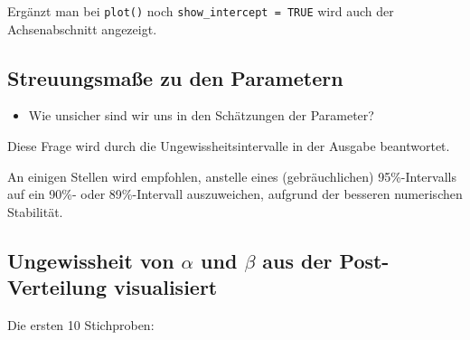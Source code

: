 \documentclass[
  a4paper,
  DIV=11]{scrreprt}
\providecommand{\tightlist}{%
  \setlength{\itemsep}{0pt}\setlength{\parskip}{0pt}}\usepackage{longtable,booktabs,array}
\theoremstyle{definition}
\theoremstyle{remark}
\begin{document}
Ergänzt man bei \texttt{plot()} noch \texttt{show\_intercept\ =\ TRUE}
wird auch der Achsenabschnitt angezeigt.

\hypertarget{streuungsmauxdfe-zu-den-parametern}{%
\subsection{Streuungsmaße zu den
Parametern}\label{streuungsmauxdfe-zu-den-parametern}}

\begin{itemize}
\tightlist
\item
  Wie unsicher sind wir uns in den Schätzungen der Parameter?
\end{itemize}

Diese Frage wird durch die Ungewissheitsintervalle in der Ausgabe
beantwortet.

\begin{tcolorbox}[enhanced jigsaw, title=\textcolor{quarto-callout-note-color}{\faInfo}\hspace{0.5em}{Hinweis}, bottomtitle=1mm, bottomrule=.15mm, titlerule=0mm, colbacktitle=quarto-callout-note-color!10!white, colframe=quarto-callout-note-color-frame, leftrule=.75mm, left=2mm, toprule=.15mm, colback=white, arc=.35mm, breakable, toptitle=1mm, opacityback=0, rightrule=.15mm, coltitle=black, opacitybacktitle=0.6]

An einigen Stellen wird empfohlen, anstelle eines (gebräuchlichen)
95\%-Intervalls auf ein 90\%- oder 89\%-Intervall auszuweichen, aufgrund
der besseren numerischen Stabilität.

\end{tcolorbox}

\hypertarget{ungewissheit-von-alpha-und-beta-aus-der-post-verteilung-visualisiert}{%
\subsection{\texorpdfstring{Ungewissheit von \(\alpha\) und \(\beta\)
aus der Post-Verteilung
visualisiert}{Ungewissheit von \textbackslash alpha und \textbackslash beta aus der Post-Verteilung visualisiert}}\label{ungewissheit-von-alpha-und-beta-aus-der-post-verteilung-visualisiert}}

Die ersten 10 Stichproben:
\end{document}
